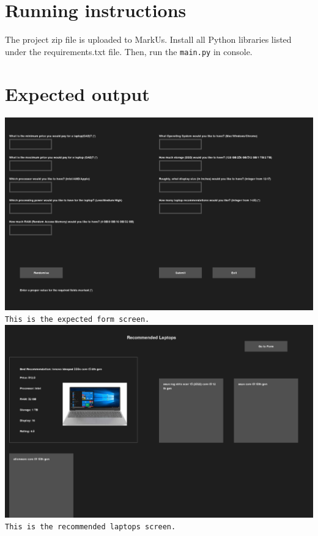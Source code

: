 \documentclass{article}
\begin{document}
\section{Running instructions}
The project zip file is uploaded to MarkUs.
Install all Python libraries listed under the requirements.txt file.
Then, run the \texttt{main.py} in console.

\section{Expected output}
\includegraphics[scale=0.1]{proj2_input_form.png}
\\
\texttt{This is the expected form screen.}
\\
\includegraphics[scale=0.1]{proj2_output_window.png}
\\
\texttt{This is the recommended laptops screen.}
\end{document}
